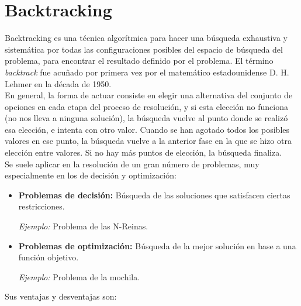 \documentclass[a4paper,12pt]{article}
\begin{document}


\newpage
\section{Backtracking}
Backtracking es una técnica algorítmica para hacer una búsqueda exhaustiva y sistemática por todas 
las configuraciones posibles del espacio de búsqueda del problema, para encontrar el resultado 
definido por el problema. El término \textit{backtrack} fue acuñado por primera vez por el matemático 
estadounidense D. H. Lehmer en la década de 1950. \\

En general, la forma de actuar consiste en elegir una alternativa del conjunto de opciones en cada 
etapa del proceso de resolución, y si esta elección no funciona (no nos lleva a ninguna solución), 
la búsqueda vuelve al punto donde se realizó esa elección, e intenta con otro valor. Cuando se han 
agotado todos los posibles valores en ese punto, la búsqueda vuelve a la anterior fase en la que se 
hizo otra elección entre valores. Si no hay más puntos de elección, la búsqueda finaliza.\\

Se suele aplicar en la resolución de un gran número de problemas, muy especialmente en los de decisión y optimización:
\begin{itemize}
    \item \textbf{Problemas de decisión:} Búsqueda de las soluciones que satisfacen ciertas restricciones.
    
    \textit{Ejemplo:} Problema de las N-Reinas.

    \item \textbf{Problemas de optimización:} Búsqueda de la mejor solución en base a una función objetivo.

    \textit{Ejemplo:} Problema de la mochila.
\end{itemize}

Sus ventajas y desventajas son:
\end{document}
